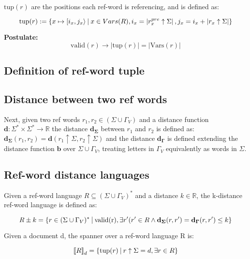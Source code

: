 \documentclass{article}
\newcommand{\abs}[1]{\left|#1\right|}
\newcommand{\set}[1]{\left\{#1\right\}}
\newcommand{\st}{\ \vline \ }
\newcommand{\dbrack}[1]{\left\llbracket#1\right\rrbracket}
\begin{document}
$\mathrm{tup}(r)$ are the positions each ref-word is referencing,
and is defined as:

\begin{equation}
    \mathrm{tup}(r) := \set{x \mapsto [i_x, j_x\rangle \st x \in
    Vars(R), i_x = \abs{r_x^{pre} \uparrow \Sigma}, j_x = i_x +
    \abs{r_x \uparrow \Sigma}}
\end{equation}

\textbf{Postulate:} 
\begin{equation}
    \mathrm{valid}(r) \rightarrow \abs{\mathrm{tup}(r)} = \abs{\mathrm{Vars}(r)}
\end{equation}
\subsection*{Definition of ref-word tuple}

\subsection*{Distance between two ref words}


Next, given two ref words $r_1, r_2 \in (\Sigma \cup \Gamma_V)$ and
a distance function 
$\mathbf{d} : \Sigma^* \times \Sigma^* \rightarrow \mathbb{R}$
the distance $\mathbf{d_\Sigma}$ between $r_1$ and $r_2$
is defined as: $\mathbf{d_\Sigma}(r_1, r_2) = \mathbf{d}(r_1 \uparrow
\Sigma, r_2 \uparrow \Sigma)$ and the distance $\mathbf{d_{\Gamma}}$ is defined extending the distance function $\mathbf{b}$ over $\Sigma\cup \Gamma_V$, treating letters in $\Gamma_V$ equivalently as words in $\Sigma$. 

\subsection*{Ref-word distance languages}

Given a ref-word language $R \subseteq (\Sigma\cup\Gamma_V)^*$ and
a distance $k \in \mathbb{R}$, the k-distance ref-word language is
defined as:

\begin{equation}
    R \pm k = \set{r \in (\Sigma \cup \Gamma_V)^* \st  \mathrm{valid(r)},
    \exists r' (r'\in R \land \mathbf{d_\Sigma}(r, r') = \mathbf{d_\Gamma}(r, r')\leq k }
\end{equation}

Given a document d, the spanner over a ref-word language R is:

\begin{equation}
    \dbrack{R}_d = \set{\mathrm{tup}(r) \st r\uparrow \Sigma = d,
    \exists r \in R}
\end{equation}
\end{document}
